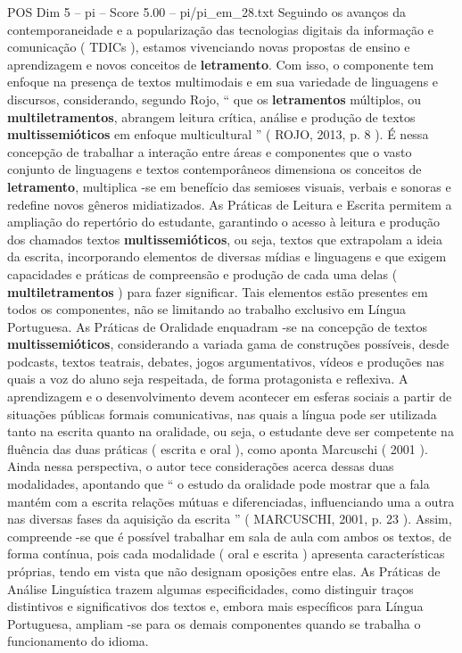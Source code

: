 \begin{textsample}{POS Dim 5 – pi – Score 5.00 – pi/pi\_em\_28.txt}
Seguindo os avanços da contemporaneidade e a popularização das tecnologias digitais da informação e comunicação ( TDICs ), estamos vivenciando novas propostas de ensino e aprendizagem e novos conceitos de \textbf{letramento}.
Com isso, o componente tem enfoque na presença de textos multimodais e em sua variedade de linguagens e discursos, considerando, segundo Rojo, “ que os \textbf{letramentos} múltiplos, ou \textbf{multiletramentos}, abrangem leitura crítica, análise e produção de textos \textbf{multissemióticos} em enfoque multicultural ” ( ROJO, 2013, p. 8 ).
É nessa concepção de trabalhar a interação entre áreas e componentes que o vasto conjunto de linguagens e textos contemporâneos dimensiona os conceitos de \textbf{letramento}, multiplica -se em benefício das semioses visuais, verbais e sonoras e redefine novos gêneros midiatizados.
As Práticas de Leitura e Escrita permitem a ampliação do repertório do estudante, garantindo o acesso à leitura e produção dos chamados textos \textbf{multissemióticos}, ou seja, textos que extrapolam a ideia da escrita, incorporando elementos de diversas mídias e linguagens e que exigem capacidades e práticas de compreensão e produção de cada uma delas ( \textbf{multiletramentos} ) para fazer significar.
Tais elementos estão presentes em todos os componentes, não se limitando ao trabalho exclusivo em Língua Portuguesa.
As Práticas de Oralidade enquadram -se na concepção de textos \textbf{multissemióticos}, considerando a variada gama de construções possíveis, desde podcasts, textos teatrais, debates, jogos argumentativos, vídeos e produções nas quais a voz do aluno seja respeitada, de forma protagonista e reflexiva.
A aprendizagem e o desenvolvimento devem acontecer em esferas sociais a partir de situações públicas formais comunicativas, nas quais a língua pode ser utilizada tanto na escrita quanto na oralidade, ou seja, o estudante deve ser competente na fluência das duas práticas ( escrita e oral ), como aponta Marcuschi ( 2001 ).
Ainda nessa perspectiva, o autor tece considerações acerca dessas duas modalidades, apontando que “ o estudo da oralidade pode mostrar que a fala mantém com a escrita relações mútuas e diferenciadas, influenciando uma a outra nas diversas fases da aquisição da escrita ” ( MARCUSCHI, 2001, p. 23 ).
Assim, compreende -se que é possível trabalhar em sala de aula com ambos os textos, de forma contínua, pois cada modalidade ( oral e escrita ) apresenta características próprias, tendo em vista que não designam oposições entre elas.
As Práticas de Análise Linguística trazem algumas especificidades, como distinguir traços distintivos e significativos dos textos e, embora mais específicos para Língua Portuguesa, ampliam -se para os demais componentes quando se trabalha o funcionamento do idioma.

\end{textsample}

